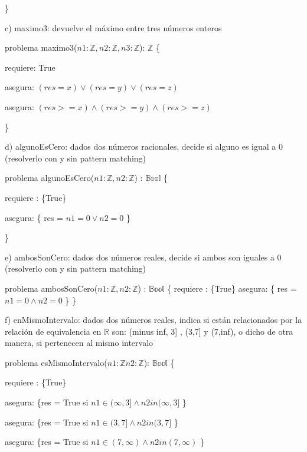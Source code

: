 \documentclass{article}
\begin{document}
    \}\newline

c) maximo3: devuelve el máximo entre tres números enteros\newline


problema maximo3($n1: \mathbb{Z}, n2: \mathbb{Z}, n3: \mathbb{Z}$): $\mathbb{Z}$ \{

    \qquad requiere: {True}


    asegura: {$(res = x) \vee (res = y) \vee (res = z)$}
    
    
    asegura: {$(res >= x) \wedge (res >= y) \wedge (res >= z)$}

\}\newline



d) algunoEsCero: dados dos números racionales, decide si alguno es igual a 0 (resolverlo con y sin pattern matching)\newline


problema algunoEsCero($n1: \mathbb{Z}, n2: \mathbb{Z}$) : $\mathbb{Bool}$ \{


    \qquad requiere : \{True\}


    asegura: \{ res = $n1 = 0 \vee n2 = 0$ \}


    \}\newline


e) ambosSonCero: dados dos números reales, decide si ambos son iguales a 0 (resolverlo con y sin pattern matching)\newline


problema ambosSonCero($n1: \mathbb{Z}, n2: \mathbb{Z}$) : $\mathbb{Bool}$ \{
    \qquad requiere : \{True\}
    asegura: \{ res = $n1 = 0 \wedge n2 = 0$ \}
    \}


f) enMismoIntervalo: dados dos números reales, indica si están relacionados por la relación de equivalencia en $\mathbb{R}$ son: (minus inf, 3] , (3,7] y (7,inf), o dicho de otra manera, si pertenecen al mismo intervalo\newline

problema esMismoIntervalo($n1: \mathbb{Z} n2: \mathbb{Z}$): $\mathbb{Bool}$ \{


    \qquad requiere : \{True\}


    asegura: \{res = True si $n1 \in (\infty, 3] \wedge n2 in (\infty, 3] $  \}

    
    asegura: \{res = True si $n1 \in (3, 7] \wedge n2 in (3, 7] $  \}


    asegura: \{res = True si $n1 \in (7, \infty) \wedge n2 in (7, \infty) $  \}
\end{document}
